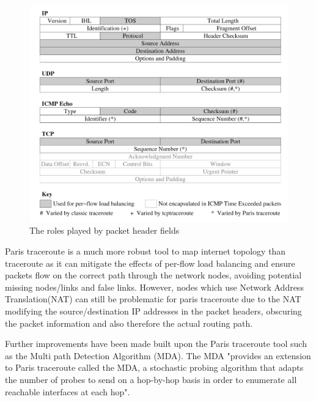 \begin{figure}[!ht]
  \begin{center}
    \includegraphics[scale=0.3]{images/packet_header.png}
    \caption{The roles played by packet header fields \cite{anomalies}}
    \label{figure:packet_header_fig}
  \end{center}
\end{figure}

Paris traceroute is a much more robust tool to map internet topology than traceroute as it can mitigate the effects of per-flow load balancing and ensure packets flow on the correct path through the network nodes, avoiding potential missing nodes/links and false links. However, nodes which use Network Address Translation(NAT) can still be problematic for paris traceroute due to the NAT modifying the source/destination IP addresses in the packet headers, obscuring the packet information and also therefore the actual routing path. \cite{anomalies}

Further improvements have been made built upon the Paris traceroute tool such as the Multi path Detection Algorithm (MDA). The MDA "provides an extension to Paris traceroute called the MDA, a stochastic probing algorithm that adapts the number of
probes to send on a hop-by-hop basis in order to enumerate all reachable interfaces at each hop". \cite{MDA2}

